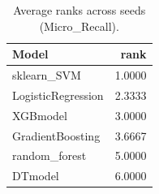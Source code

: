 \begin{table}[t]
\centering
\begin{tabular}{lr}
\toprule
Model & rank \\
\midrule
sklearn_SVM & 1.0000 \\
LogisticRegression & 2.3333 \\
XGBmodel & 3.0000 \\
GradientBoosting & 3.6667 \\
random_forest & 5.0000 \\
DTmodel & 6.0000 \\
\bottomrule
\end{tabular}
\caption{Average ranks across seeds (Micro_Recall).}
\label{tab:avg_rank_Micro_Recall}
\end{table}